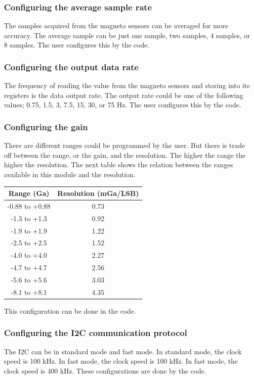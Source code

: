 \subsubsection{Configuring the average sample rate}
The samples acquired from the magneto sensors can be averaged for more accuracy.
The average sample can be just one sample, two samples, 4 samples, or 8 samples.
The user configures this by the code.
\subsubsection{Configuring the output data rate}
The frequency of reading the value from the magneto sensors and storing into its registers is the data output rate.
The output rate could be one of the following values; 0.75, 1.5, 3, 7.5, 15, 30, or 75 Hz.
The user configures this by the code.
\subsubsection{Configuring the gain}
There are different ranges could be programmed by the user. But there is trade off between the range, or the gain, and the resolution. The higher the range the higher the resolution.
The next table shows the relation between the ranges available in this module and the resolution.

\begin{table}[h]
\def\arraystretch{1.5}
\centering
\begin{tabular}{| c | c |}
\hline
 \textbf{Range (Ga)} &  \textbf{Resolution (mGa/LSB)} \\
 \hline
 -0.88 to +0.88 &  0.73 \\
 \hline
 -1.3 to +1.3 & 0.92 \\
 \hline
 -1.9 to +1.9 & 1.22 \\
 \hline
  -2.5 to +2.5 & 1.52 \\
 \hline
   -4.0 to +4.0 & 2.27 \\
 \hline
   -4.7 to +4.7 & 2.56 \\
 \hline
   -5.6 to +5.6 & 3.03 \\
 \hline
   -8.1 to +8.1 & 4.35 \\
 \hline
 
\end{tabular}
\end{table}
This configuration can be done in the code.
\subsubsection{Configuring the I2C communication protocol}
The I2C can be in standard mode and fast mode.
In standard mode, the clock speed is 100 kHz. In fast mode, the clock speed is 100 kHz.
In fast mode, the clock speed is 400 kHz.
These configurations are done by the code.

